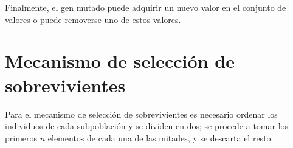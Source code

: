 Finalmente, el gen mutado puede adquirir un nuevo valor en el conjunto de valores o puede removerse uno de estos valores.

\section{Mecanismo de selección de sobrevivientes}

Para el mecanismo de selección de sobrevivientes es necesario ordenar los individuos de cada subpoblación y se dividen en dos; se procede a tomar los primeros $n$ elementos de cada una de las mitades, y se descarta el resto.
